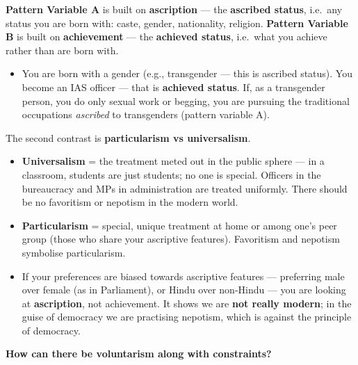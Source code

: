 \textbf{Pattern Variable A} is built on \textbf{ascription} --- the \textbf{ascribed status}, i.e.\ any status you are born with: caste, gender, nationality, religion. \textbf{Pattern Variable B} is built on \textbf{achievement} --- the \textbf{achieved status}, i.e.\ what you achieve rather than are born with.

\begin{ExampleBox}
\begin{itemize}
\item You are born with a gender (e.g., transgender --- this is ascribed status). You become an IAS officer --- that is \textbf{achieved status}. If, as a transgender person, you do only sexual work or begging, you are pursuing the traditional occupations \textit{ascribed} to transgenders (pattern variable A).
\end{itemize}
\end{ExampleBox}

The second contrast is \textbf{particularism vs universalism}.

\begin{ComparisonBox}
\begin{itemize}
\item \textbf{Universalism} = the treatment meted out in the public sphere --- in a classroom, students are just students; no one is special. Officers in the bureaucracy and MPs in administration are treated uniformly. There should be no favoritism or nepotism in the modern world.
\item \textbf{Particularism} = special, unique treatment at home or among one's peer group (those who share your ascriptive features). Favoritism and nepotism symbolise particularism.
\end{itemize}
\end{ComparisonBox}

\begin{CriticalPoint}
\begin{itemize}
\item If your preferences are biased towards ascriptive features --- preferring male over female (as in Parliament), or Hindu over non-Hindu --- you are looking at \textbf{ascription}, not achievement. It shows we are \textbf{not really modern}; in the guise of democracy we are practising nepotism, which is against the principle of democracy.
\end{itemize}
\end{CriticalPoint}

\textbf{How can there be voluntarism along with constraints?}

